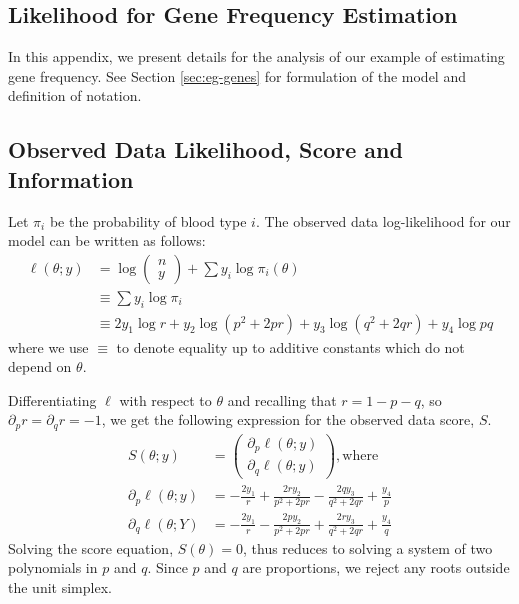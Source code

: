 \documentclass[11pt, oneside]{article}   	%
\begin{document}
\newpage

\begin{appendices}

    \section{Likelihood for Gene Frequency Estimation}
    \label{app:blood}

    In this appendix, we present details for the analysis of our example of estimating gene frequency. See Section \ref{sec:eg-genes} for formulation of the model and definition of notation.

    \subsection{Observed Data Likelihood, Score and Information}
    \label{app:blood_obs}

    Let $\pi_i$ be the probability of blood type $i$. The observed data log-likelihood for our model can be written as follows:
    \begin{align}
        \ell(\theta; y) &= \log \begin{pmatrix} n \\ y \end{pmatrix} + \sum y_i \log \pi_i(\theta)\\
        & \equiv \sum y_i \log \pi_i\\
        &\equiv 2 y_1 \log r + y_2 \log(p^2 + 2pr) + y_3 \log(q^2 + 2qr) + y_4 \log pq
    \end{align}
    where we use $\equiv$ to denote equality up to additive constants which do not depend on $\theta$.

    Differentiating $\ell$ with respect to $\theta$ and recalling that $r = 1 - p - q$, so $\partial_p r = \partial_q r = -1$, we get the following expression for the observed data score, $S$.
    \begin{align}
        S(\theta; y) &= \begin{pmatrix}
            \partial_p \ell(\theta; y)\\
            \partial_q \ell(\theta; y) 
        \end{pmatrix} \mathrm{, where}\\
        \partial_p \ell(\theta; y) &= - \frac{2 y_1}{r}  + \frac{2r y_2}{p^2 + 2pr}  - \frac{2q y_3}{q^2 + 2qr}  + \frac{y_4}{p} \label{eq:gene_obs_score1}\\
        \partial_q \ell(\theta; Y) &= - \frac{2 y_1}{r}  - \frac{2p y_2}{p^2 + 2pr}  + \frac{2r y_3}{q^2 + 2qr}  + \frac{y_4}{q} \label{eq:gene_obs_score2}
    \end{align}
    Solving the score equation, $S(\theta) = 0$, thus reduces to solving a system of two polynomials in $p$ and $q$. Since $p$ and $q$ are proportions, we reject any roots outside the unit simplex.


\end{appendices}
\end{document}

